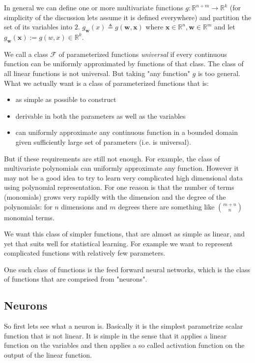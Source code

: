 \documentclass[11pt, a4paper]{report}
\theoremstyle{plain}
\theoremstyle{definition}
\theoremstyle{remark}
\newcommand{\R}{\mathbb{R}}
\newcommand{\x}{\mathbf{x}}
\newcommand{\w}{\mathbf{w}}
\begin{document}
In general we can define one or more multivariate
functions $g : \R^{n+m} \to \R^k$ (for simplicity of the discussion lets assume 
it is defined everywhere) and partition the set of its variables into $2$. 
$g_{\w}(x) \triangleq g(\w,\x)$ where 
$\x \in \R^n, \w
\in \R^m$ and let $g_{\w}(\x) := g(w,x) \in \R^k$.


We call a class $\mathcal{F}$ of parameterized functions \emph{universal} if
every continuous function can be uniformly approximated by functions of that
class.
The class of all linear functions is not universal.
But taking "any function" $g$ is too general. What we actually want is a 
class of parameterized functions that is:
\begin{itemize}
\item{} as simple as possible to construct
\item{} derivable in both the parameters as well as the variables
\item{} can uniformly approximate any continuous function in a bounded domain
given sufficiently large set of
parameters (i.e. is universal).
\end{itemize}

But if these requirements are still not enough.
For example, the class of multivariate polynomials can
uniformly approximate any function. However it may not be a good idea to try
to learn very complicated high dimensional data using polynomial representation. 
For one reason is that the number of terms (monomials) grows very rapidly with the
dimension and the degree of the polynomials: for $n$ dimensions and $m$ degrees
there are something like $\binom{m + n}{n}$ monomial terms.

We want this class of simpler functions, that are almost as simple as linear,
and yet that suits well for statistical learning. For example we want to
represent complicated functions with relatively few parameters.

One such class of functions is the feed forward neural networks,
which is the class of functions that are comprised from "neurons".

\subsection{Neurons}

So first lets see what a neuron is. Basically it is the simplest parametrize
scalar function that is not linear. It is simple in the sense that it applies a
linear function on the variables and then applies a so called activation
function on the output of the linear function.
\end{document}
